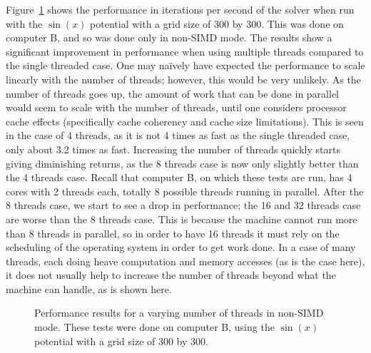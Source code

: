 Figure~\ref{fig:perf-numthreads} shows the performance in iterations per second of the solver when run
with the $\sin(x)$ potential with a grid size of 300 by 300. This was done on computer B, and so was done
only in non-SIMD mode. The results show a significant improvement in performance when using multiple threads
compared to the single threaded case. One may na\"{i}vely have expected the performance to scale linearly
with the number of threads; however, this would be very unlikely. As the number of threads goes up, the amount
of work that can be done in parallel would seem to scale with the number of threads, until one considers processor cache effects (specifically
cache coherency and cache size limitations). This is seen in the case of 4 threads, as it is not 4 times as fast as
the single threaded case, only about 3.2 times as fast. Increasing the number of threads quickly starts giving diminishing
returns, as the 8 threads case is now only slightly better than the 4 threads case. Recall that computer B, on which these
tests are run, has 4 cores with 2 threads each, totally 8 possible threads running in parallel. After the 8 threads case,
we start to see a drop in performance; the 16 and 32 threads case are worse than the 8 threads case. This is because
the machine cannot run more than 8 threads in parallel, so in order to have 16 threads it must rely on the scheduling
of the operating system in order to get work done. In a case of many threads, each doing heave computation and memory accesses
(as is the case here), it does not usually help to increase the number of threads beyond what the machine can handle,
as is shown here.

\begin{figure}[h]
	\centering
\caption{Performance results for a varying number of threads in non-SIMD mode. These
tests were done on computer B, using the $\sin(x)$ potential with a grid size of 300 by 300.}
\label{fig:perf-numthreads}
\end{figure}



